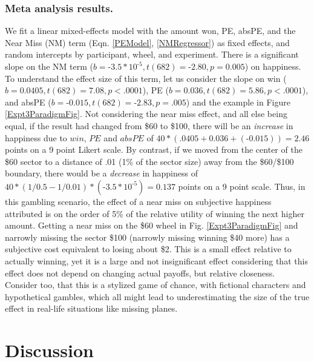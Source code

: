 \documentclass[10pt,letterpaper]{article}
\newcommand{\red}[1]{\textcolor{Red}{#1}}
\begin{document}
\subsubsection{Meta analysis results.}

We fit a linear mixed-effects model with the amount won, PE, absPE, and the Near Miss (NM) term (Eqn. \ref{PEModel}, \ref{NMRegressor}) as fixed effects, and random intercepts by participant, wheel, and experiment. There is a significant slope on the NM term ($b = \text{-}3.5 * 10^{\text{-}5}, t(682)=\text{-}2.80, p=0.005$) on happiness. To understand the effect size of this term, let us consider the slope on win ($b = 0.0405, t(682) = 7.08, p<.0001$), PE ($b=0.036, t(682)=5.86, p<.0001$), and absPE ($b=\text{-}0.015, t(682) = \text{-}2.83, p=.005$) and the example in Figure \ref{Expt3ParadigmFig}. Not considering the near miss effect, and all else being equal, if the result had changed from \$60 to \$100, there will be an \textit{increase} in happiness due to $win$, $PE$ and $absPE$ of $40*(.0405+0.036+(\text{-}0.015)) = 2.46$ points on a 9 point Likert scale. By contrast, if we moved from the center of the \$60 sector to a distance of .01 (1\% of the sector size) away from the \$60/\$100 boundary, there would be a \textit{decrease} in happiness of $40*(1/0.5 - 1/0.01)*(\text{-}3.5 * 10^{\text{-}5}) = 0.137$ points on a 9 point scale. Thus, in this gambling scenario, the effect of a near miss on subjective happiness attributed is on the order of 5\% of the relative utility of winning the next higher amount. Getting a near miss on the \$60 wheel in Fig. \ref{Expt3ParadigmFig} and narrowly missing the sector \$100 (narrowly missing winning \$40 more) has a subjective cost equivalent to losing about \$2. This is a small effect relative to actually winning, yet it is  a large and not insignificant effect considering that this effect does not depend on changing actual payoffs, but relative closeness. Consider too, that this is a stylized game of chance, with fictional characters and hypothetical gambles, which all might lead to underestimating the size of the true effect in real-life situations like missing planes.


\section{Discussion}
\end{document}
